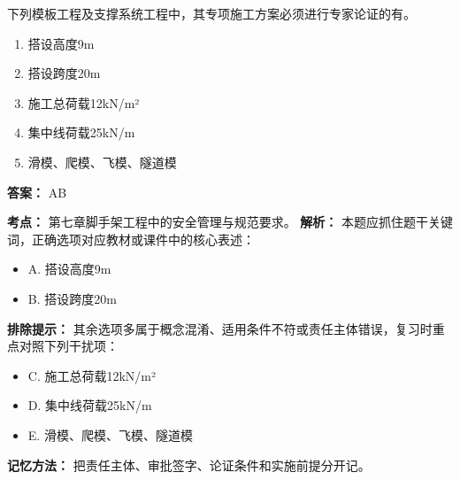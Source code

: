\documentclass[UTF8,fontset=fandol,11pt]{ctexart}
\begin{document}
\begin{quizbox}[title={第 4 题}]
下列模板工程及支撑系统工程中，其专项施工方案必须进行专家论证的有。\\
\begin{enumerate}[label=\Alph*.]
\item 搭设高度9m
\item 搭设跨度20m
\item 施工总荷载12kN/m²
\item 集中线荷载25kN/m
\item 滑模、爬模、飞模、隧道模
\end{enumerate}
\textbf{答案：} AB
\vspace{0.25em}
\begin{answerbox}[title={考点解析}]
\textbf{考点：} 第七章脚手架工程中的安全管理与规范要求。
\textbf{解析：} 本题应抓住题干关键词，正确选项对应教材或课件中的核心表述：
\begin{itemize}
\item A. 搭设高度9m
\item B. 搭设跨度20m
\end{itemize}
\textbf{排除提示：} 其余选项多属于概念混淆、适用条件不符或责任主体错误，复习时重点对照下列干扰项：
\begin{itemize}
\item C. 施工总荷载12kN/m²
\item D. 集中线荷载25kN/m
\item E. 滑模、爬模、飞模、隧道模
\end{itemize}
\textbf{记忆方法：} 把责任主体、审批签字、论证条件和实施前提分开记。
\end{answerbox}
\end{quizbox}

\vspace{0.2em}
\end{document}
